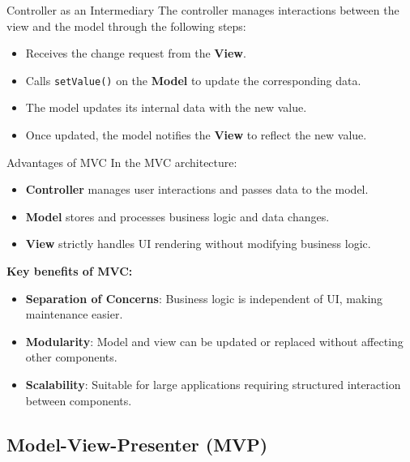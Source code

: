 \documentclass[aspectratio=169, table]{beamer}
\begin{document}
\begin{frame}[fragile]{Controller as an Intermediary}
	\vspace{20pt}
	The controller manages interactions between the view and the model through the following steps:
	\begin{itemize}
		\item Receives the change request from the \textbf{View}.
		\item Calls \texttt{setValue()} on the \textbf{Model} to update the corresponding data.
		\item The model updates its internal data with the new value.
		\item Once updated, the model notifies the \textbf{View} to reflect the new value.
	\end{itemize}
\end{frame}

\begin{frame}[fragile]{Advantages of MVC}
	\vspace{20pt}
	In the MVC architecture:
	\begin{itemize}
		\item \textbf{Controller} manages user interactions and passes data to the model.
		\item \textbf{Model} stores and processes business logic and data changes.
		\item \textbf{View} strictly handles UI rendering without modifying business logic.
	\end{itemize}
	
	\textbf{Key benefits of MVC:}
	\begin{itemize}
		\item \textbf{Separation of Concerns}: Business logic is independent of UI, making maintenance easier.
		\item \textbf{Modularity}: Model and view can be updated or replaced without affecting other components.
		\item \textbf{Scalability}: Suitable for large applications requiring structured interaction between components.
	\end{itemize}
\end{frame}


\subsection{Model-View-Presenter (MVP)}
\end{document}
